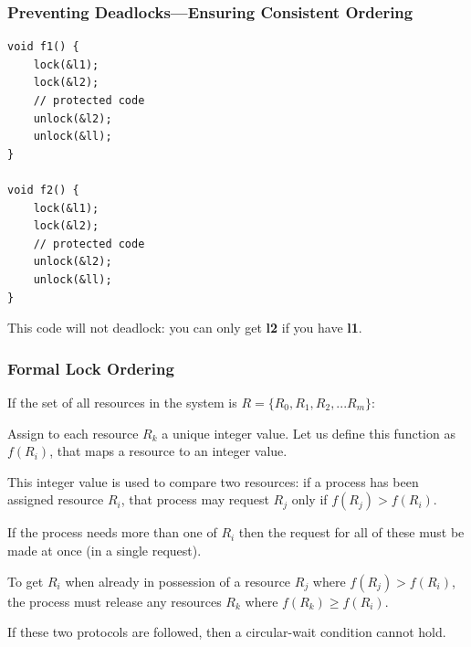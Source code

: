 \begin{frame}[fragile]
  \frametitle{Preventing Deadlocks---Ensuring Consistent Ordering}

  
  \begin{lstlisting}
void f1() {
    lock(&l1);
    lock(&l2);
    // protected code
    unlock(&l2);
    unlock(&ll);    
}

void f2() {
    lock(&l1);
    lock(&l2);
    // protected code
    unlock(&l2);
    unlock(&ll);    
}
  \end{lstlisting}

     This code will not deadlock: you can only get {\bf l2} if you have
      {\bf l1}.
  
\end{frame}



\begin{frame}
\frametitle{Formal Lock Ordering}


If the set of all resources in the system is $R = \{R_{0}, R_{1}, R_{2}, ... R_{m}\}$:

Assign to each resource $R_{k}$ a unique integer value. Let us define this function as $f(R_{i})$, that maps a resource to an integer value. 

This integer value is used to compare two resources: if a process has been assigned resource $R_{i}$, that process may request $R_{j}$ only if $f(R_{j}) > f(R_{i})$. 

If the process needs more than one of $R_{i}$ then the request for all of these must be made at once (in a single request). 

To get $R_{i}$ when already in possession of a resource $R_{j}$ where $f(R_{j}) > f(R_{i})$, the process must release any resources $R_{k}$ where $f(R_{k}) \geq f(R_{i})$. 

If these two protocols are followed, then a circular-wait condition cannot hold.



\end{frame}


